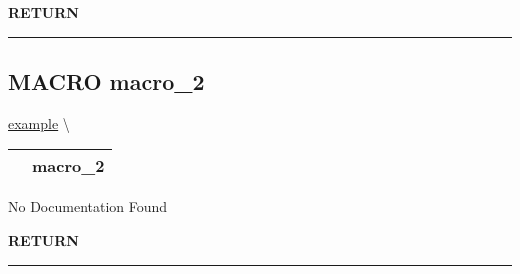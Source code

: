 \par
\begin{description}
\item [\colorbox{tagtype}{\color{white} \textbf{\textsf{RETURN}}}] \textbf{} 
\end{description}




\rule{\linewidth}{0.5pt}
\subsection*{\textsf{\colorbox{headtoc}{\color{white} MACRO}
macro\_2}}

\hypertarget{ecldoc:example.macro_2}{}
\hspace{0pt} \hyperlink{ecldoc:example}{example} \textbackslash 

{\renewcommand{\arraystretch}{1.5}
\begin{tabularx}{\textwidth}{|>{\raggedright\arraybackslash}l|X|}
\hline
\hspace{0pt}\mytexttt{\color{red} } & \textbf{macro\_2} \\
\hline
\end{tabularx}
}

\par





No Documentation Found








\par
\begin{description}
\item [\colorbox{tagtype}{\color{white} \textbf{\textsf{RETURN}}}] \textbf{} 
\end{description}




\rule{\linewidth}{0.5pt}


